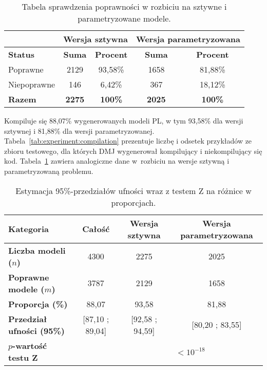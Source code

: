 \begin{table}[H]
\caption{Tabela sprawdzenia poprawności w rozbiciu na sztywne i parametryzowane modele.}\label{tab:experiment:compilation:breakdown}
\centering%
\begin{tabular}{|l|c|c|c|c|}
\hline%
	&\multicolumn{2}{c|}{Wersja sztywna}&\multicolumn{2}{c|}{Wersja parametryzowana}\\
\hline
\textbf{Status} & \textbf{Suma} & \textbf{Procent} & \textbf{Suma} & \textbf{Procent} \\
\hline
Poprawne & 2129 & 93,58\% & 1658 & 81,88\% \\
\hline
Niepoprawne & 146 & 6,42\% & 367 & 18,12\%\\
\hline
\textbf{Razem} & \textbf{2275} & \textbf{100\%} &\textbf{2025} & \textbf{100\%} \\
\hline
\end{tabular}
\end{table}

Kompiluje się 88,07\% wygenerowanych modeli PL, w tym 93,58\% dla wersji sztywnej i 81,88\% dla wersji parametryzowanej. Tabela~\ref{tab:experiment:compilation} prezentuje liczbę i odsetek przykładów ze zbioru testowego, dla których DMJ wygenerował kompilujący i niekompilujący się kod. Tabela~\ref{tab:experiment:compilation:breakdown} zawiera analogiczne dane w~rozbiciu na wersje sztywną i parametryzowaną problemu.

\begin{table}[H]
\caption{Estymacja 95\%-przedziałów ufności wraz z testem Z na różnice w proporcjach.}\label{tab:experiment:analysis1}
\centering%
\begin{tabular}{|l|c|c|c|}
\hline
\textbf{Kategoria} & \textbf{Całość} & \textbf{Wersja sztywna} & \textbf{Wersja parametryzowana} \\
\hline
\textbf{Liczba modeli ($n$)} & 4300 & 2275 & 2025 \\
\hline
\textbf{Poprawne modele ($m$)} & 3787 & 2129 & 1658 \\
\hline
\textbf{Proporcja (\%)} & 88,07 & 93,58 & 81,88 \\
\hline
\textbf{Przedział ufności (95\%)} & [87,10 ; 89,04] & [92,58 ; 94,59] & [80,20 ; 83,55] \\
\hline
\textbf{$p$-wartość testu Z}&&\multicolumn{2}{c|}{$<10^{-18}$}\\
\hline
\end{tabular}
\end{table}

